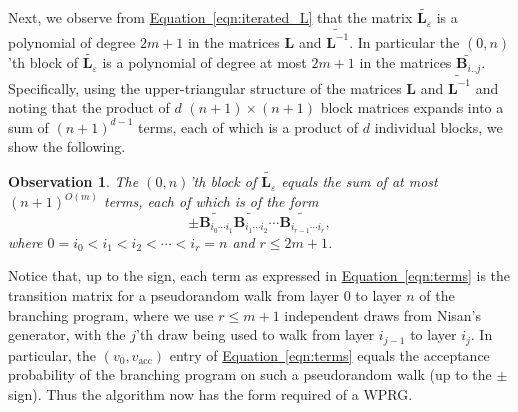 \documentclass[11pt]{article}
\numberwithin{equation}{section}
\theoremstyle{definition}
\theoremstyle{plain}
\newcommand{\expeqref}[2]{\hyperref[#2]{#1~\eqref{#2}}}
\newtheorem{observation}[theorem]{Observation}
\newcommand{\eps}{\varepsilon}
\newcommand{\mB}{\mathbf{B}}
\newcommand{\mL}{\mathbf{L}}
\newcommand{\vac}{v_{\text{acc}}}
\newcommand{\Lt}{\widetilde{\mathbf{L}^{-1}}}
\newcommand{\Lte}{\widetilde{\mathbf{L}_{\eps}}}
\begin{document}
    Next, we observe from \expeqref{Equation}{eqn:iterated_L} that the matrix $\Lte$ is a polynomial of degree $2m+1$ in the matrices $\mL$ and $\Lt$.  In particular the $(0,n)$'th block of $\Lte$ is a polynomial of degree at most $2m+1$ in the matrices $\widetilde{\mB_{i .. j}}$.  Specifically, using the upper-triangular structure of the matrices $\mL$ and $\Lt$ and noting that the product of $d$ $(n+1)\times (n+1)$ block matrices expands into a sum of $(n+1)^{d-1}$ terms, each of which is a product of $d$ individual blocks, we show the following. %
    
    \begin{observation} \label{obs:path}
    The $(0,n)$'th block of $\Lte$ equals the sum of at most $(n+1)^{O(m)}$ terms, each of which is of the form 
    \begin{equation} \label{eqn:terms}
    \pm \widetilde{\mB_{i_0\cdots i_1}}
    \widetilde{\mB_{i_1\cdots i_2}}
    \cdots
    \widetilde{\mB_{i_{r-1}\cdots i_r}},
    \end{equation}
    where $0=i_0<i_1<i_2<\cdots<i_r=n$ and $r\leq 2m+1$.
    \end{observation}
    
    Notice that, up to the sign, each term as expressed in \expeqref{Equation}{eqn:terms} is the transition matrix for a pseudorandom walk from layer 0 to layer $n$ of the branching program, where we use $r\leq m+1$ independent draws from Nisan's generator, with the $j$'th draw being used to walk from layer $i_{j-1}$ to layer $i_j$.  In particular,
    the $(v_0,\vac)$ entry of \expeqref{Equation}{eqn:terms} equals the acceptance probability of the branching program on such a pseudorandom walk (up to the $\pm$ sign).
    Thus the algorithm now has the form required of a WPRG. 
    
\end{document}
